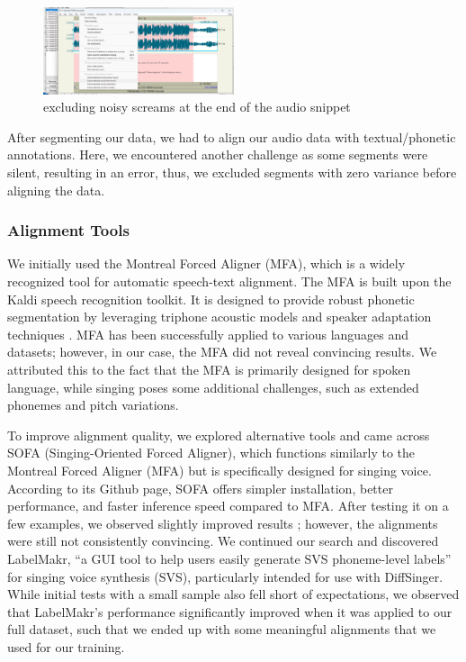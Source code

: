\documentclass[a4paper]{article}
\begin{document}
\begin{figure}[htbp]
    \centering
    \includegraphics[width=0.5\textwidth]{graphics/cutting_noise.png}
    \caption{excluding noisy screams at the end of the audio snippet}
    \label{fig:bild1}
\end{figure}

After segmenting our data, we had to align our audio data with textual/phonetic annotations. Here, we encountered another challenge as some segments were silent, resulting in an error, thus, we excluded segments with zero variance before aligning the data.

\subsubsection{Alignment Tools}
We initially used the Montreal Forced Aligner (MFA), which is a widely recognized tool for automatic speech-text alignment. The MFA is built upon the Kaldi speech recognition toolkit. It is designed to provide robust phonetic segmentation by leveraging triphone acoustic models and speaker adaptation techniques \cite{McAuliffe2017}. MFA has been successfully applied to various languages and datasets; however, in our case, the MFA did not reveal convincing results. We attributed this to the fact that the MFA is primarily designed for spoken language, while singing poses some additional challenges, such as extended phonemes and pitch variations. 

To improve alignment quality, we explored alternative tools and came across SOFA (Singing-Oriented Forced Aligner), which functions similarly to the Montreal Forced Aligner (MFA) but is specifically designed for singing voice. According to its Github page, SOFA offers simpler installation, better performance, and faster inference speed compared to MFA. After testing it on a few examples, we observed slightly improved results \cite{Greenleaf2001}; however, the alignments were still not consistently convincing. We continued our search and discovered LabelMakr, “a GUI tool to help users easily generate SVS phoneme-level labels” \cite{spicytigermeat} for singing voice synthesis (SVS), particularly intended for use with DiffSinger. While initial tests with a small sample also fell short of expectations, we observed that LabelMakr's performance significantly improved when it was applied to our full dataset, such that we ended up with some meaningful alignments that we used for our training.
\end{document}
